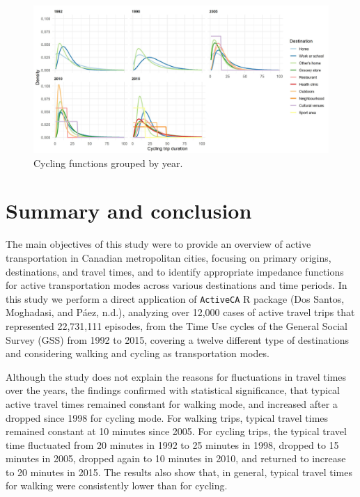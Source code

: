 \documentclass[preprint, 3p,
authoryear]{elsarticle} %
\begin{document}
\begin{figure}

{\centering \includegraphics[width=1\linewidth]{figures/cycling_functions_by_year} 

}

\caption{Cycling functions grouped by year.}\label{fig:cycling-function-by-year-fig}
\end{figure}

\hypertarget{summary-and-conclusion}{%
\section{Summary and conclusion}\label{summary-and-conclusion}}

The main objectives of this study were to provide an overview of active
transportation in Canadian metropolitan cities, focusing on primary
origins, destinations, and travel times, and to identify appropriate
impedance functions for active transportation modes across various
destinations and time periods. In this study we perform a direct
application of \texttt{ActiveCA} R package (Dos Santos, Moghadasi, and
Páez, n.d.), analyzing over 12,000 cases of active travel trips that
represented 22,731,111 episodes, from the Time Use cycles of the General
Social Survey (GSS) from 1992 to 2015, covering a twelve different type
of destinations and considering walking and cycling as transportation
modes.

Although the study does not explain the reasons for fluctuations in
travel times over the years, the findings confirmed with statistical
significance, that typical active travel times remained constant for
walking mode, and increased after a dropped since 1998 for cycling mode.
For walking trips, typical travel times remained constant at 10 minutes
since 2005. For cycling trips, the typical travel time fluctuated from
20 minutes in 1992 to 25 minutes in 1998, dropped to 15 minutes in 2005,
dropped again to 10 minutes in 2010, and returned to increase to 20
minutes in 2015. The results also show that, in general, typical travel
times for walking were consistently lower than for cycling.
\end{document}

